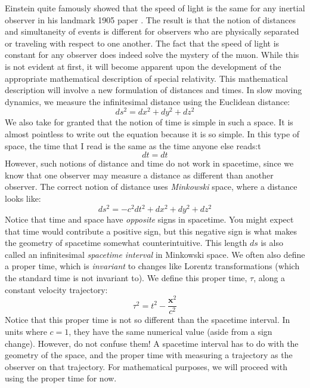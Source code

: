 Einstein quite famously showed that the speed of light is the same for any inertial observer in his landmark 1905 paper \cite{einstein_zur_1905}. The result is that the notion of distances and simultaneity of events is different for observers who are physically separated or traveling with respect to one another. The fact that the speed of light is constant for any observer does indeed solve the mystery of the muon. While this is not evident at first, it will become apparent upon the development of the appropriate mathematical description of special relativity. This mathematical description will involve a new formulation of distances and times. In slow moving dynamics, we measure the infinitesimal distance using the Euclidean distance:
$$ds^2=dx^2+dy^2+dz^2$$
We also take for granted that the notion of time is simple in such a space. It is almost pointless to write out the equation because it is so simple. In this type of space, the time that I read is the same as the time anyone else reads:t
$$dt=dt$$
However, such notions of distance and time do not work in spacetime, since we know that one observer may measure a distance as different than another observer. The correct notion of distance uses \textit{Minkowski} space, where a distance looks like:
$$ds^2=-c^2dt^2+dx^2+dy^2+dz^2$$
Notice that time and space have \textit{opposite} signs in spacetime. You might expect that time would contribute a positive sign, but this negative sign is what makes the geometry of spacetime somewhat counterintuitive. This length $ds$ is also called an infinitesimal \textit{spacetime interval} in Minkowski space. We often also define a proper time, which is \textit{invariant} to changes like Lorentz transformations (which the standard time is not invariant to). We define this proper time, $\tau$, along a constant velocity trajectory:
$$\tau^2=t^2-\frac{\bm{x}^2}{c^2}$$
Notice that this proper time is not so different than the spacetime interval. In units where $c=1$, they have the same numerical value (aside from a sign change). However, do not confuse them! A spacetime interval has to do with the geometry of the space, and the proper time with measuring a trajectory as the observer on that trajectory. For mathematical purposes, we will proceed with using the proper time for now.

